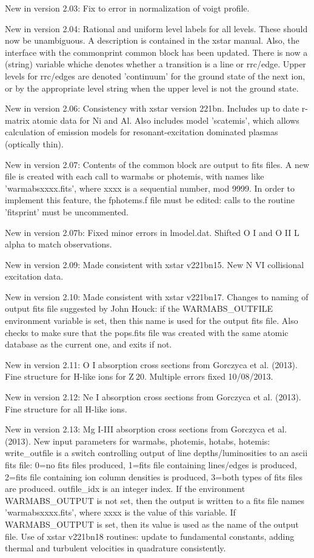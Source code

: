 New in version 2.03: Fix to error in normalization of voigt profile.

New in version 2.04: Rational and uniform level labels for all levels.
These should now be unambiguous.  A description is contained in the xstar 
manual.  Also, the interface with the commonprint common block has been 
updated.  There is now a (string) variable whiche denotes whether a 
transition is a line or rrc/edge.  Upper levels for rrc/edges are denoted
'continuum' for the ground state of the next ion, or by the appropriate 
level string when the upper level is not the ground state.

New in version 2.06:  Consistency with xstar version 221bn.  Includes 
up to date r-matrix atomic data for Ni and Al.  Also includes model
'scatemis', which allows calculation of emission models for resonant-excitation
dominated plasmas (optically thin).

New in version 2.07:  Contents of the common block are output to fits files.
A new file is created with each call to warmabs or photemis, with names like
'warmabsxxxx.fits', where xxxx is a sequential number, mod 9999. In order 
to implement this feature, the fphotems.f file must be edited:  calls to 
the routine 'fitsprint' must be uncommented.

New in version 2.07b:  Fixed minor errors in lmodel.dat.  Shifted O I and O II 
L alpha to match observations.

New in version 2.09:  Made consistent with xstar v221bn15.  New N VI collisional 
excitation data.

New in version 2.10:  Made consistent with xstar v221bn17.  Changes to naming of output fits file suggested by John Houck:  if the WARMABS\_OUTFILE environment variable is set, then this name is used for the output fits file.  Also checks to make sure that the pops.fits file was created with the same atomic database as the current one, and exits if not.

New in version 2.11:  O I absorption cross sections from Gorczyca et al. (2013). Fine structure for H-like ions for Z$\>$20.
Multiple errors fixed 10/08/2013.

New in version 2.12:  Ne I absorption cross sections from Gorczyca et al. (2013). Fine structure for all H-like ions.

New in version 2.13:  Mg I-III absorption cross sections from Gorczyca et al. (2013). 
New input parameters for warmabs, photemis, hotabs, hotemis:  
write\_outfile is a switch controlling output of line depths/luminosities to an ascii fits file:  
0=no fits files produced, 
1=fits file containing lines/edges is produced, 
2=fits file containing ion column densities is produced, 
3=both types of fits files 
are produced.
outfile\_idx is an integer index.  If the environment WARMABS\_OUTPUT is not set, 
then the output is written to a fits file names 'warmabsxxxx.fits', where
xxxx is the value of this variable.  If WARMABS\_OUTPUT is set, then its 
value is used as the name of the output file.
Use of xstar v221bn18 routines:  update to fundamental constants, adding 
thermal and turbulent velocities in quadrature consistently.

